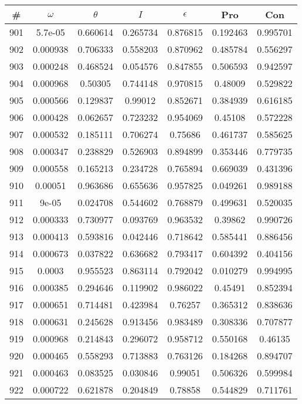 \newpage
\begin{table}
\begin{tabular}{c|c|c|c|c|c|c}
\# & $\omega$ & $\theta$ & $I$ & $\epsilon$ & Pro & Con\\
\hline
901 & 5.7e-05 & 0.660614 & 0.265734 & 0.876815 & 0.192463 & 0.995701\\
902 & 0.000938 & 0.706333 & 0.558203 & 0.870962 & 0.485784 & 0.556297\\
903 & 0.000248 & 0.468524 & 0.054576 & 0.847855 & 0.506593 & 0.942597\\
904 & 0.000968 & 0.50305 & 0.744148 & 0.970815 & 0.48009 & 0.529822\\
905 & 0.000566 & 0.129837 & 0.99012 & 0.852671 & 0.384939 & 0.616185\\
906 & 0.000428 & 0.062657 & 0.723232 & 0.954069 & 0.45108 & 0.572228\\
907 & 0.000532 & 0.185111 & 0.706274 & 0.75686 & 0.461737 & 0.585625\\
908 & 0.000347 & 0.238829 & 0.526903 & 0.894899 & 0.353446 & 0.779735\\
909 & 0.000558 & 0.165213 & 0.234728 & 0.765894 & 0.669039 & 0.431396\\
910 & 0.00051 & 0.963686 & 0.655636 & 0.957825 & 0.049261 & 0.989188\\
911 & 9e-05 & 0.024708 & 0.544602 & 0.768879 & 0.499631 & 0.520035\\
912 & 0.000333 & 0.730977 & 0.093769 & 0.963532 & 0.39862 & 0.990726\\
913 & 0.000413 & 0.593816 & 0.042446 & 0.718642 & 0.585441 & 0.886456\\
914 & 0.000673 & 0.037822 & 0.636682 & 0.793417 & 0.604392 & 0.404156\\
915 & 0.0003 & 0.955523 & 0.863114 & 0.792042 & 0.010279 & 0.994995\\
916 & 0.000385 & 0.294646 & 0.119902 & 0.986022 & 0.45491 & 0.852394\\
917 & 0.000651 & 0.714481 & 0.423984 & 0.76257 & 0.365312 & 0.838636\\
918 & 0.000631 & 0.245628 & 0.913456 & 0.983489 & 0.308336 & 0.707877\\
919 & 0.000968 & 0.214843 & 0.296072 & 0.958712 & 0.550168 & 0.46135\\
920 & 0.000465 & 0.558293 & 0.713883 & 0.763126 & 0.184268 & 0.894707\\
921 & 0.000463 & 0.083525 & 0.030846 & 0.99051 & 0.506326 & 0.599984\\
922 & 0.000722 & 0.621878 & 0.204849 & 0.78858 & 0.544829 & 0.711761\\

\end{tabular}
\end{table}
